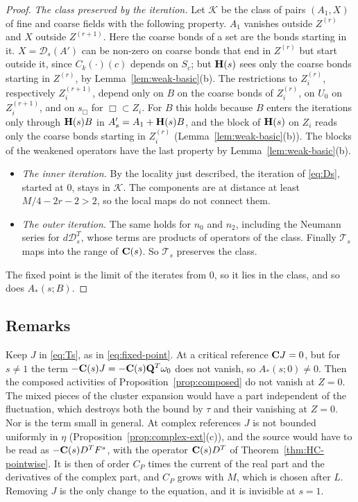 \begin{proof}
\emph{The class preserved by the iteration.} Let $\mathcal K$ be the class of pairs $(A_1,X)$ of fine and coarse fields with the following property. $A_1$ vanishes outside $Z^{(r)}$ and $X$ outside $Z^{(r+1)}$. Here the coarse bonds of a set are the bonds starting in it. $X=\mathcal D_s(A')$ can be non-zero on coarse bonds that end in $Z^{(r)}$ but start outside it, since $C_k(\cdot)(c)$ depends on $S_c$; but $\mathbf H(s)$ sees only the coarse bonds starting in $Z^{(r)}$, by Lemma~\ref{lem:weak-basic}(b). The restrictions to $Z_i^{(r)}$, respectively $Z_i^{(r+1)}$, depend only on $B$ on the coarse bonds of $Z_i^{(r)}$, on $U_0$ on $Z_i^{(r+1)}$, and on $s_\Box$ for $\Box\subset Z_i$. For $B$ this holds because $B$ enters the iterations only through $\mathbf H(s)B$ in $A'_s=A_1+\mathbf H(s)B$, and the block of $\mathbf H(s)$ on $Z_i$ reads only the coarse bonds starting in $Z_i^{(r)}$ (Lemma~\ref{lem:weak-basic}(b)). The blocks of the weakened operators have the last property by Lemma~\ref{lem:weak-basic}(b).
\begin{itemize}
\item \emph{The inner iteration.} By the locality just described, the iteration of \eqref{eq:Ds}, started at $0$, stays in $\mathcal K$. The components are at distance at least $M/4-2r-2>2$, so the local maps do not connect them.
\item \emph{The outer iteration.} The same holds for $n_0$ and $n_2$, including the Neumann series for $d\mathcal D_s^T$, whose terms are products of operators of the class. Finally $\mathcal T_s$ maps into the range of $\mathbf C(s)$. So $\mathcal T_s$ preserves the class.
\end{itemize}
The fixed point is the limit of the iterates from $0$, so it lies in the class, and so does $A_*(s;B)$.
\end{proof}

\subsection{Remarks}

\begin{remark}
Keep $J$ in \eqref{eq:Ts}, as in \eqref{eq:fixed-point}. At a critical reference $\mathbf C J=0$, but for $s\ne1$ the term $-\mathbf C(s)J=-\mathbf C(s)\mathbf Q^T\omega_0$ does not vanish, so $A_*(s;0)\ne0$. Then the composed activities of Proposition~\ref{prop:composed} do not vanish at $Z=0$. The mixed pieces of the cluster expansion would have a part independent of the fluctuation, which destroys both the bound by $\tau$ and their vanishing at $Z=0$. Nor is the term small in general. At complex references $J$ is not bounded uniformly in $\eta$ (Proposition~\ref{prop:complex-ext}(c)), and the source would have to be read as $-\mathbf C(s)D^TF^s$, with the operator $\mathbf C(s)D^T$ of Theorem~\ref{thm:HC-pointwise}. It is then of order $C_P$ times the current of the real part and the derivatives of the complex part, and $C_P$ grows with $M$, which is chosen after $L$. Removing $J$ is the only change to the equation, and it is invisible at $s=1$.
\end{remark}

